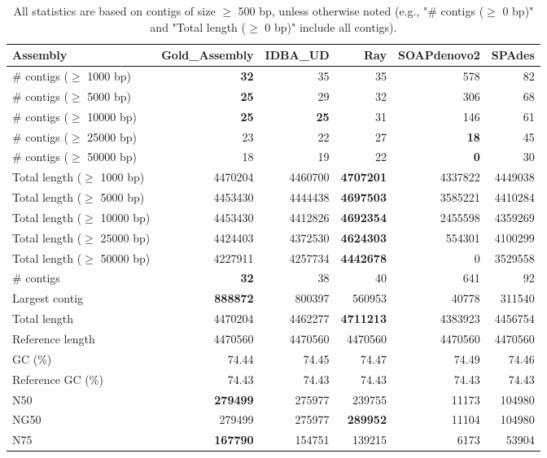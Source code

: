 \documentclass[12pt,a4paper]{article}
\begin{document}
\begin{table}[ht]
\begin{center}
\caption{All statistics are based on contigs of size $\geq$ 500 bp, unless otherwise noted (e.g., "\# contigs ($\geq$ 0 bp)" and "Total length ($\geq$ 0 bp)" include all contigs).}
\begin{tabular}{|l*{5}{|r}|}
\hline
Assembly & Gold\_Assembly & IDBA\_UD & Ray & SOAPdenovo2 & SPAdes \\ \hline
\# contigs ($\geq$ 1000 bp) & {\bf 32} & 35 & 35 & 578 & 82 \\ \hline
\# contigs ($\geq$ 5000 bp) & {\bf 25} & 29 & 32 & 306 & 68 \\ \hline
\# contigs ($\geq$ 10000 bp) & {\bf 25} & {\bf 25} & 31 & 146 & 61 \\ \hline
\# contigs ($\geq$ 25000 bp) & 23 & 22 & 27 & {\bf 18} & 45 \\ \hline
\# contigs ($\geq$ 50000 bp) & 18 & 19 & 22 & {\bf 0} & 30 \\ \hline
Total length ($\geq$ 1000 bp) & 4470204 & 4460700 & {\bf 4707201} & 4337822 & 4449038 \\ \hline
Total length ($\geq$ 5000 bp) & 4453430 & 4444438 & {\bf 4697503} & 3585221 & 4410284 \\ \hline
Total length ($\geq$ 10000 bp) & 4453430 & 4412826 & {\bf 4692354} & 2455598 & 4359269 \\ \hline
Total length ($\geq$ 25000 bp) & 4424403 & 4372530 & {\bf 4624303} & 554301 & 4100299 \\ \hline
Total length ($\geq$ 50000 bp) & 4227911 & 4257734 & {\bf 4442678} & 0 & 3529558 \\ \hline
\# contigs & {\bf 32} & 38 & 40 & 641 & 92 \\ \hline
Largest contig & {\bf 888872} & 800397 & 560953 & 40778 & 311540 \\ \hline
Total length & 4470204 & 4462277 & {\bf 4711213} & 4383923 & 4456754 \\ \hline
Reference length & 4470560 & 4470560 & 4470560 & 4470560 & 4470560 \\ \hline
GC (\%) & 74.44 & 74.45 & 74.47 & 74.49 & 74.46 \\ \hline
Reference GC (\%) & 74.43 & 74.43 & 74.43 & 74.43 & 74.43 \\ \hline
N50 & {\bf 279499} & 275977 & 239755 & 11173 & 104980 \\ \hline
NG50 & 279499 & 275977 & {\bf 289952} & 11104 & 104980 \\ \hline
N75 & {\bf 167790} & 154751 & 139215 & 6173 & 53904 \\ \hline

\end{tabular}
\end{center}
\end{table}
\end{document}
